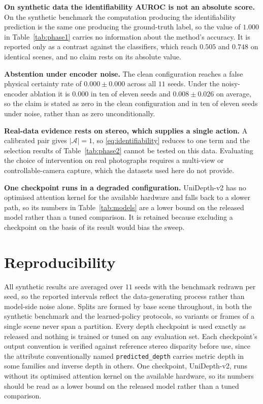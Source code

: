 \textbf{On synthetic data the identifiability AUROC is not an absolute score.} On the
synthetic benchmark the computation producing the identifiability prediction is the
same one producing the ground-truth label, so the value of $1.000$ in
Table~\ref{tab:phase1} carries no information about the method's accuracy. It is
reported only as a contrast against the classifiers, which reach $0.505$ and
$0.748$ on identical scenes, and no claim rests on its absolute value.

\textbf{Abstention under encoder noise.} The clean configuration reaches a false
physical certainty rate of $0.000 \pm 0.000$ across all $11$ seeds. Under the
noisy-encoder ablation it is $0.000$ in ten of eleven seeds and $0.008 \pm 0.026$
on average, so the claim is stated as zero in the clean configuration and in ten of
eleven seeds under noise, rather than as zero unconditionally.

\textbf{Real-data evidence rests on stereo, which supplies a single action.} A
calibrated pair gives $|\mathcal{A}| = 1$, so \eqref{eq:identifiability} reduces to
one term and the selection results of Table~\ref{tab:phase2} cannot be tested on
this data. Evaluating the choice of intervention on real photographs requires a
multi-view or controllable-camera capture, which the datasets used here do not
provide.

\textbf{One checkpoint runs in a degraded configuration.} UniDepth-v2 has no
optimised attention kernel for the available hardware and falls back to a slower
path, so its numbers in Table~\ref{tab:models} are a lower bound on the released
model rather than a tuned comparison. It is retained because excluding a checkpoint
on the basis of its result would bias the sweep.

\section{Reproducibility}
\label{sec:supp-repro}

All synthetic results are averaged over $11$ seeds with the benchmark redrawn per
seed, so the reported intervals reflect the data-generating process rather than
model-side noise alone. Splits are formed by base scene throughout, in both the
synthetic benchmark and the learned-policy protocols, so variants or frames of a
single scene never span a partition. Every depth checkpoint is used exactly as
released and nothing is trained or tuned on any evaluation set. Each checkpoint's
output convention is verified against reference stereo disparity before use, since
the attribute conventionally named \texttt{predicted\_depth} carries metric depth
in some families and inverse depth in others. One checkpoint, UniDepth-v2, runs
without its optimised attention kernel on the available hardware, so its numbers
should be read as a lower bound on the released model rather than a tuned
comparison.

